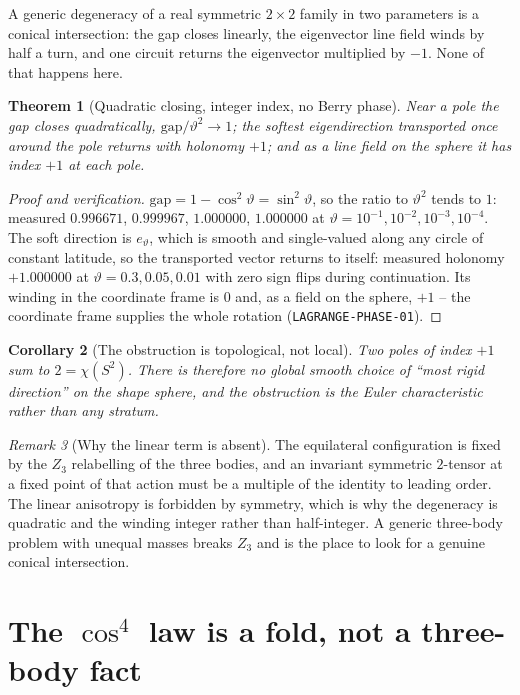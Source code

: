 \documentclass[11pt]{article}
\newtheorem{theorem}{Theorem}
\newtheorem{corollary}[theorem]{Corollary}
\theoremstyle{remark}
\newtheorem{remark}[theorem]{Remark}
\begin{document}
A generic degeneracy of a real symmetric $2\times2$ family in two parameters is a conical
intersection: the gap closes linearly, the eigenvector line field winds by half a turn, and
one circuit returns the eigenvector multiplied by $-1$. None of that happens here.

\begin{theorem}[Quadratic closing, integer index, no Berry phase]\label{t:lagrange}
Near a pole the gap closes quadratically,
$\mathrm{gap}/\vartheta^{2}\to1$; the softest eigendirection transported once around the
pole returns with holonomy $+1$; and as a line field on the sphere it has index $+1$ at each
pole.
\end{theorem}
\begin{proof}[Proof and verification]
$\mathrm{gap}=1-\cos^{2}\vartheta=\sin^{2}\vartheta$, so the ratio to $\vartheta^{2}$ tends
to $1$: measured $0.996671$, $0.999967$, $1.000000$, $1.000000$ at
$\vartheta=10^{-1},10^{-2},10^{-3},10^{-4}$. The soft direction is $e_\vartheta$, which is
smooth and single-valued along any circle of constant latitude, so the transported vector
returns to itself: measured holonomy $+1.000000$ at $\vartheta=0.3,0.05,0.01$ with zero sign
flips during continuation. Its winding in the coordinate frame is $0$ and, as a field on the
sphere, $+1$ -- the coordinate frame supplies the whole rotation
(\texttt{LAGRANGE-PHASE-01}).
\end{proof}

\begin{corollary}[The obstruction is topological, not local]
Two poles of index $+1$ sum to $2=\chi(S^{2})$. There is therefore no global smooth choice
of ``most rigid direction'' on the shape sphere, and the obstruction is the Euler
characteristic rather than any stratum.
\end{corollary}

\begin{remark}[Why the linear term is absent]
The equilateral configuration is fixed by the $Z_3$ relabelling of the three bodies, and an
invariant symmetric $2$-tensor at a fixed point of that action must be a multiple of the
identity to leading order. The linear anisotropy is forbidden by symmetry, which is why the
degeneracy is quadratic and the winding integer rather than half-integer. A generic
three-body problem with unequal masses breaks $Z_3$ and is the place to look for a genuine
conical intersection.
\end{remark}

\section{The $\cos^{4}$ law is a fold, not a three-body fact}
\end{document}
